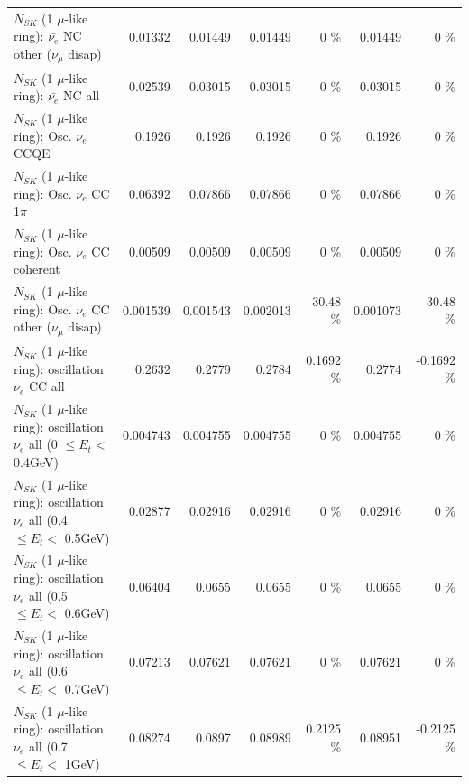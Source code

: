 \begin{table}
\begin{tabular}{| l | r | r | r  r | r  r |}
          $N_{SK}$ (1 $\mu$-like ring): $\bar{\nu_e}$ NC other ($\nu_\mu$ disap) &         0.01332 &         0.01449 &         0.01449 &        0 \%  &         0.01449 &        0 \%  \\ 
                            $N_{SK}$ (1 $\mu$-like ring): $\bar{\nu_{e}}$ NC all &         0.02539 &         0.03015 &         0.03015 &        0 \%  &         0.03015 &        0 \%  \\ 
\hline
\hline
\hline
                                 $N_{SK}$ (1 $\mu$-like ring): Osc. $\nu_e$ CCQE &          0.1926 &          0.1926 &          0.1926 &        0 \%  &          0.1926 &        0 \%  \\ 
                            $N_{SK}$ (1 $\mu$-like ring): Osc. $\nu_e$ CC 1$\pi$ &         0.06392 &         0.07866 &         0.07866 &        0 \%  &         0.07866 &        0 \%  \\ 
                          $N_{SK}$ (1 $\mu$-like ring): Osc. $\nu_e$ CC coherent &         0.00509 &         0.00509 &         0.00509 &        0 \%  &         0.00509 &        0 \%  \\ 
           $N_{SK}$ (1 $\mu$-like ring): Osc. $\nu_e$ CC other ($\nu_\mu$ disap) &        0.001539 &        0.001543 &        0.002013 &    30.48 \%  &        0.001073 &   -30.48 \%  \\ 
                        $N_{SK}$ (1 $\mu$-like ring): oscillation $\nu_e$ CC all &          0.2632 &          0.2779 &          0.2784 &   0.1692 \%  &          0.2774 &  -0.1692 \%  \\ 
\hline
$N_{SK}$ (1 $\mu$-like ring): oscillation $\nu_{e}$ all (0 $\leq E_{t} <$ 0.4GeV) &        0.004743 &        0.004755 &        0.004755 &        0 \%  &        0.004755 &        0 \%  \\ 
$N_{SK}$ (1 $\mu$-like ring): oscillation $\nu_{e}$ all (0.4 $\leq E_{t} <$ 0.5GeV) &         0.02877 &         0.02916 &         0.02916 &        0 \%  &         0.02916 &        0 \%  \\ 
$N_{SK}$ (1 $\mu$-like ring): oscillation $\nu_{e}$ all (0.5 $\leq E_{t} <$ 0.6GeV) &         0.06404 &          0.0655 &          0.0655 &        0 \%  &          0.0655 &        0 \%  \\ 
$N_{SK}$ (1 $\mu$-like ring): oscillation $\nu_{e}$ all (0.6 $\leq E_{t} <$ 0.7GeV) &         0.07213 &         0.07621 &         0.07621 &        0 \%  &         0.07621 &        0 \%  \\ 
$N_{SK}$ (1 $\mu$-like ring): oscillation $\nu_{e}$ all (0.7 $\leq E_{t} <$ 1GeV) &         0.08274 &          0.0897 &         0.08989 &   0.2125 \%  &         0.08951 &  -0.2125 \%  \\ 

\end{tabular}
\end{table}
